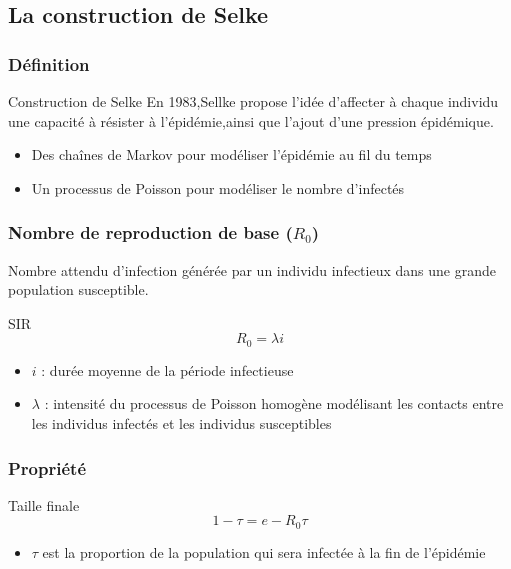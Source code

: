 \subsection{La construction de Selke}

\begin{frame}
    \frametitle{Définition}
    \begin{block}{Construction de Selke}
        En 1983,Sellke propose l'idée d'affecter à chaque individu une capacité à résister à l'épidémie,ainsi que l'ajout d'une pression épidémique.
    \end{block}

    \begin{itemize}
        \item Des chaînes de Markov pour modéliser l'épidémie au fil du temps
        \item Un processus de Poisson pour modéliser le nombre d'infectés
    \end{itemize}
\end{frame}


\begin{frame}
        \frametitle{Nombre de reproduction de base ($R_0$)}

        Nombre attendu d’infection générée par un individu infectieux dans une grande population susceptible.

        \begin{alertblock}{SIR}
                $$ R_0 =  \lambda i $$
        \end{alertblock}

        \begin{itemize}
                \item $i$ : durée moyenne de la période infectieuse
                \item $\lambda$ : intensité du processus de Poisson homogène modélisant les contacts entre les individus infectés et les individus susceptibles
        \end{itemize}
\end{frame}

\begin{frame}
    \frametitle{Propriété}

    \begin{block}{Taille finale}
        $$ 1 - \tau = e - R_0\tau $$
    \end{block}

    \begin{itemize}
        \item $\tau$ est la proportion de la population qui sera infectée à la fin de l’épidémie
    \end{itemize}
\end{frame}


